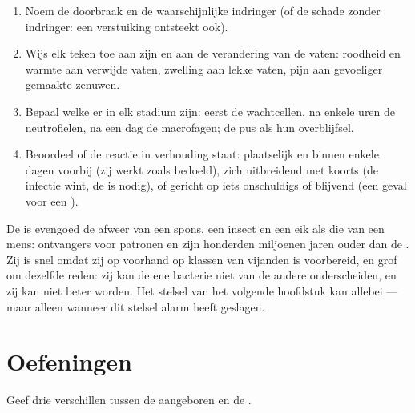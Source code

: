 \begin{method}\label{met:g12:innate-immunity:read}
\begin{enumerate}
  \item Noem de doorbraak en de waarschijnlijke indringer (of de schade
        zonder indringer: een verstuiking ontsteekt ook).
  \item Wijs elk teken toe aan zijn  en aan de verandering van de
        vaten: roodheid en warmte aan verwijde vaten, zwelling aan lekke
        vaten, pijn aan gevoeliger gemaakte zenuwen.
  \item Bepaal welke  er in elk stadium zijn: eerst de wachtcellen,
        na enkele uren de neutrofielen, na een dag de macrofagen; de pus
        als hun overblijfsel.
  \item Beoordeel of de reactie in verhouding staat: plaatselijk en
        binnen enkele dagen voorbij (zij werkt zoals bedoeld), zich
        uitbreidend met koorts (de infectie wint, de  is
        nodig), of gericht op iets onschuldigs of blijvend (een geval voor
        een ).
\end{enumerate}
\end{method}

\begin{remark}\label{rem:g12:innate-immunity:old}
De  is evengoed de afweer van een spons, een insect en
een eik als die van een mens: ontvangers voor patronen en  zijn
honderden miljoenen jaren ouder dan de . Zij is snel omdat zij
op voorhand op klassen van vijanden is voorbereid, en grof om dezelfde
reden: zij kan de ene bacterie niet van de andere onderscheiden, en zij
kan niet beter worden. Het stelsel van het volgende hoofdstuk kan allebei
--- maar alleen wanneer dit stelsel alarm heeft geslagen.
\end{remark}

\section{Oefeningen}

\begin{exercise}[$\star$]\label{exo:g12:innate-immunity:1}
Geef drie verschillen tussen de aangeboren en de .
\end{exercise}

